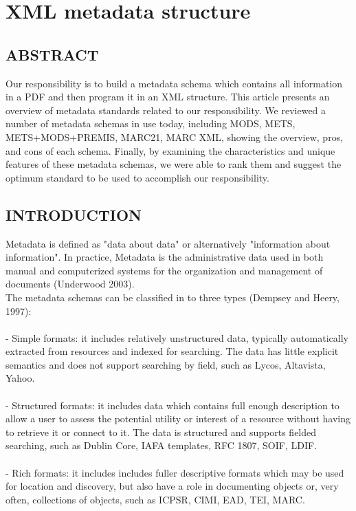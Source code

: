 % 
% 

\section*{XML metadata structure}
\subsection{ABSTRACT}
\label{sec:abs}
Our responsibility is to build a metadata schema which contains all information in a PDF and then program it in an XML structure. This article presents an overview of metadata standards related to our responsibility. We reviewed a number of metadata schemas in use today, including MODS, METS, METS+MODS+PREMIS, MARC21, MARC XML, showing the overview, pros, and cons of each schema. Finally, by examining the characteristics and unique features of these metadata schemas, we were able to rank them and suggest the optimum standard to be used to accomplish our responsibility.
\subsection{INTRODUCTION}
Metadata is defined as "data about data" or alternatively "information about information". In practice, Metadata is the administrative data used in both manual and computerized systems for the organization and management of documents (Underwood 2003).\\

The metadata schemas can be classified in to three types (Dempsey and Heery, 1997):\\\\
- Simple formats: it includes relatively unstructured data, typically automatically extracted from resources and indexed for searching. The data has little explicit semantics and does not support searching by field, such as Lycos, Altavista, Yahoo.\\\\	
- Structured formats: it includes data which contains full enough description to allow a user to assess the potential utility or interest of a resource without having to retrieve it or connect to it. The data is structured and supports fielded searching, such as Dublin Core, IAFA templates, RFC 1807, SOIF, LDIF.\\\\
- Rich formats: it includes includes fuller descriptive formats which may be used for location and discovery, but also have a role in documenting objects or, very often, collections of objects, such as ICPSR, CIMI, EAD, TEI, MARC.\\

